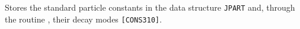                
 
 
Stores the standard particle constants in the data structure
{\tt JPART} and, through the routine , their decay modes 
{\tt [CONS310]}.
 
